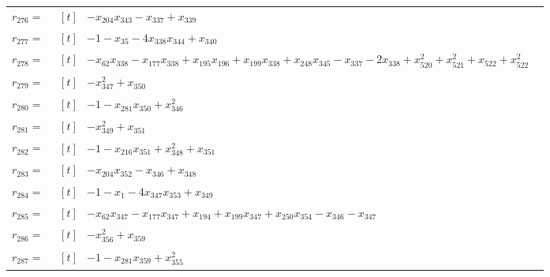 \begin{longtable}{@{}r p{0.92\linewidth}@{}}
$r_{276}=$ & $\begin{aligned}[t]&-x_{204}x_{343}-x_{337}+x_{339}\end{aligned}$ \\[2pt]
$r_{277}=$ & $\begin{aligned}[t]&-1-x_{35}-4x_{338}x_{344}+x_{340}\end{aligned}$ \\[2pt]
$r_{278}=$ & $\begin{aligned}[t]&-x_{62}x_{338}-x_{177}x_{338}+x_{195}x_{196}+x_{199}x_{338}+x_{248}x_{345}-x_{337}-2x_{338}+x_{520}^{2}+x_{521}^{2}+x_{522}+x_{522}^{2}\end{aligned}$ \\[2pt]
$r_{279}=$ & $\begin{aligned}[t]&-x_{347}^{2}+x_{350}\end{aligned}$ \\[2pt]
$r_{280}=$ & $\begin{aligned}[t]&-1-x_{281}x_{350}+x_{346}^{2}\end{aligned}$ \\[2pt]
$r_{281}=$ & $\begin{aligned}[t]&-x_{349}^{2}+x_{351}\end{aligned}$ \\[2pt]
$r_{282}=$ & $\begin{aligned}[t]&-1-x_{216}x_{351}+x_{348}^{2}+x_{351}\end{aligned}$ \\[2pt]
$r_{283}=$ & $\begin{aligned}[t]&-x_{204}x_{352}-x_{346}+x_{348}\end{aligned}$ \\[2pt]
$r_{284}=$ & $\begin{aligned}[t]&-1-x_{1}-4x_{347}x_{353}+x_{349}\end{aligned}$ \\[2pt]
$r_{285}=$ & $\begin{aligned}[t]&-x_{62}x_{347}-x_{177}x_{347}+x_{194}+x_{199}x_{347}+x_{250}x_{354}-x_{346}-x_{347}\end{aligned}$ \\[2pt]
$r_{286}=$ & $\begin{aligned}[t]&-x_{356}^{2}+x_{359}\end{aligned}$ \\[2pt]
$r_{287}=$ & $\begin{aligned}[t]&-1-x_{281}x_{359}+x_{355}^{2}\end{aligned}$ \\[2pt]

\end{longtable}
